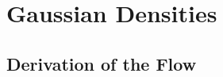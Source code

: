 \documentclass{article}
\begin{document}



\section{Gaussian Densities}

\subsection{Derivation of the Flow}
\end{document}
